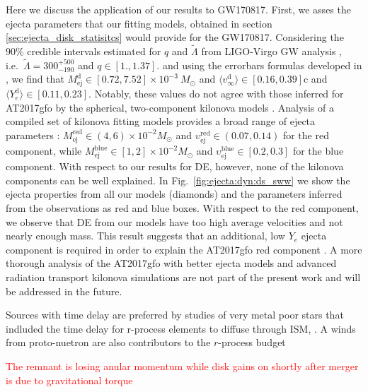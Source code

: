 \documentclass[11pt,a4paper,headinclude=true,DIV=14,BCOR=8mm,chapterprefix,listof=totoc,twoside,openright,abstracton]{scrbook}
\newcommand{\red}[1]{\textcolor{red}{#1}}
\newcommand{\GW}{GW170817}
\newcommand{\AT}{AT2017gfo} %
\def\md{M^{\text{d}}_{\text{ej}}}
\def\vd{v^{\text{d}}_\infty}
\def\yd{Y^{\text{d}}_{e}}
\def\amd{\md}
\def\avd{\langle\vd\rangle}
\def\ayd{\langle\yd\rangle}
\begin{document}
Here we discuss the application of our results to \GW{}.
First, we asses the ejecta parameters that our fitting models, 
obtained in section \ref{sec:ejecta_disk_statisitcs} would provide for the \GW{}.
Considering the $90\%$ credible intervals estimated for $q$ and $\tilde{\Lambda}$ 
from LIGO-Virgo GW analysis
\citep{TheLIGOScientific:2017qsa,Abbott:2018wiz,De:2018uhw,Abbott:2018exr},
i.e.~$\tilde{\Lambda}=300_{-190}^{+500}$ and $q\in[1., 1.37]$. 
and using the errorbars formulas developed in \cite{Radice:2018pdn}, we find that
$\amd \in [0.72, 7.52] \times 10^{-3}\: M_{\odot}$
and
$\avd \in [0.16, 0.39]$c 
and 
$\ayd \in [0.11, 0.23]$.
Notably, these values do not agree with those inferred for \AT{} by the spherical, 
two-component kilonova models \citep{Villar:2017wcc}.
Analysis of a compiled set of kilonova fitting models provides a broad range of ejecta 
parameters \citep{Siegel:2019mlp}:
$M_{\text{ej}}^{\text{red}}\in(4, 6)\times10^{-2}M_{\odot}$ and
$\upsilon_{\text{ej}}^{\text{red}}\in(0.07, 0.14)$ for the red component, while
$M_{\text{ej}}^{\text{blue}}\in[1, 2]\times10^{-2}M_{\odot}$ and 
$\upsilon_{\text{ej}}^{\text{blue}}\in[0.2, 0.3]$ for the blue component.
With respect to our results for \ac{DE}, however, 
none of the kilonova components can be well explained.
In Fig.~\ref{fig:ejecta:dyn:ds_sww} we show the ejecta properties from
all our models (diamonds) and the parameters inferred from the
observations as red and blue boxes. 
With respect to the red component, we observe that \ac{DE} from our models 
have too high average velocities and not nearly enough mass.
This result suggests that an additional, low $Y_e$ ejecta component is required
in order to explain the \AT{} red component 
\citep{Perego:2017wtu,Kawaguchi:2018ptg,Nedora:2019jhl}.
A more thorough analysis of the \AT{} with better ejecta models and advanced
radiation transport kilonova simulations are not part of the present work 
and will be addressed in the future.



Sources with time delay are preferred by studies of very metal poor stars that indluded the time delay for r-process elements
to diffuse through ISM, \citep{Tarumi:2021xvw}. 
A winds from proto-nuetron are also contributors to the $r$-process budget \cite{Vincenzo:2021rvw}

\red{The remnant is losing anular momentum while disk gains on shortly after merger is due to gravitational torque \cite{Shibata:2019wef}}

 
\appendix






\backmatter



\end{document}
